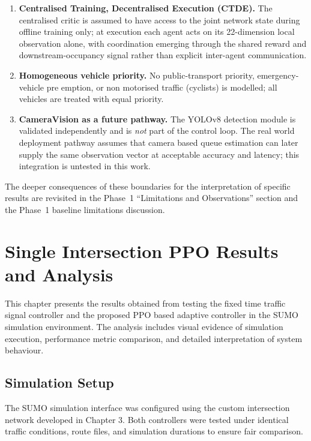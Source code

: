 ﻿\documentclass[11pt, a4paper]{report}
\begin{document}
\begin{enumerate}
    \item \textbf{Centralised Training, Decentralised Execution (CTDE).} The centralised critic is assumed to have access to the joint network state during offline training only; at execution each agent acts on its 22-dimension local observation alone, with coordination emerging through the shared reward and downstream-occupancy signal rather than explicit inter-agent communication.

    \item \textbf{Homogeneous vehicle priority.} No public-transport priority, emergency-vehicle pre emption, or non motorised traffic (cyclists) is modelled; all vehicles are treated with equal priority.

    \item \textbf{CameraVision as a future pathway.} The YOLOv8 detection module is validated independently and is \emph{not} part of the control loop. The real world deployment pathway assumes that camera based queue estimation can later supply the same observation vector at acceptable accuracy and latency; this integration is untested in this work.
\end{enumerate}

The deeper consequences of these boundaries for the interpretation of specific results are revisited in the Phase~1 ``Limitations and Observations'' section and the Phase~1 baseline limitations discussion.

\chapter{Single Intersection PPO Results and Analysis}

This chapter presents the  results obtained from testing the fixed time traffic signal controller and the proposed PPO based adaptive controller in the SUMO simulation environment. The analysis includes visual evidence of simulation execution, performance metric comparison, and detailed interpretation of system behaviour.

\section{Simulation Setup}

The SUMO simulation interface was configured using the custom intersection network developed in Chapter 3. Both controllers were tested under identical traffic conditions, route files, and simulation durations to ensure fair comparison.
\end{document}
